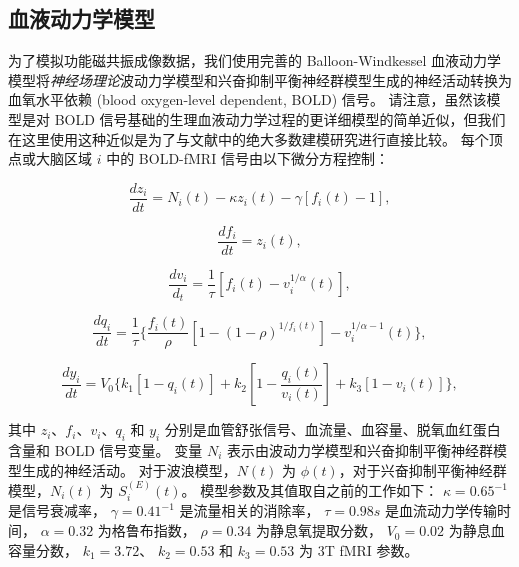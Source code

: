 \documentclass[lang=cn,a4paper,newtx]{elegantpaper}
\begin{document}
\subsection{血液动力学模型} \label{sec:haemodynamic_model}

为了模拟功能磁共振成像数据，我们使用完善的 Balloon-Windkessel 血液动力学模型将\textit{神经场理论}波动力学模型和兴奋抑制平衡神经群模型生成的神经活动转换为血氧水平依赖 (blood oxygen-level dependent, BOLD) 信号\cite{stephan2007comparing}。
请注意，虽然该模型是对 BOLD 信号\cite{aquino2012hemodynamic,pang2017effects,pang2018biophysically}基础的生理血液动力学过程的更详细模型的简单近似，但我们在这里使用这种近似是为了与文献中的绝大多数建模研究进行直接比较\cite{deco2021dynamical,demirtacs2019hierarchical,aquino2022intersection,deco2009key,cabral2014exploring}。
每个顶点或大脑区域 $ i $ 中的 BOLD-fMRI 信号由以下微分方程控制：

\begin{equation}\label{eq:vasodilatory_signal}
	\frac{dz_i}{dt} = N_i (t) - 
					  \kappa z_i(t) - 
					  \gamma [f_i(t) - 1], 
\end{equation}


\begin{equation}\label{eq:blood_inflow}
	\frac{df_i}{dt} = z_i(t),
\end{equation}


\begin{equation}\label{eq:blood_volume}
	\frac{dv_i}{d_t} = \frac{1}{\tau} [f_i(t) - v_i^{1/\alpha} (t)],
\end{equation}


\begin{equation}\label{eq:deoxyhaemoglobin}
	\frac{dq_i}{dt} = \frac{1}{\tau}
					\{
					\frac{f_i(t)}{\rho}
					[1 - (1-\rho)^{1/f_i(t)}]
						- v_i^{1/\alpha - 1} (t)
					\},
\end{equation}


\begin{equation}\label{eq:BOLD_signal}
	\frac{dy_i}{dt} = V_0
					\{
						k_1 [1 - q_i(t)] +
						k_2 [1 - \frac{q_i(t)}{v_i(t)}] + 
						k_3 [1 - v_i(t)]
					\},
\end{equation}


其中 $ z_i $、$ f_i $、$ v_i $、$ q_i $ 和 $ y_i $ 分别是血管舒张信号、血流量、血容量、脱氧血红蛋白含量和 BOLD 信号变量。
变量 $ N_i $ 表示由波动力学模型和兴奋抑制平衡神经群模型生成的神经活动。
对于波浪模型，$ N(t) $ 为 $ \phi (t) $，对于兴奋抑制平衡神经群模型，$ N_i (t) $ 为 $ S_i^{(E)} (t) $。
模型参数及其值取自之前的工作\cite{stephan2007comparing,heinzle2016hemodynamic}如下：
$ \kappa = 0.65^{-1} $ 是信号衰减率，
$ \gamma = 0.41^{-1} $ 是流量相关的消除率，
$ \tau = 0.98 s $ 是血流动力学传输时间，
$ \alpha = 0.32 $ 为格鲁布指数，
$ \rho = 0.34 $ 为静息氧提取分数，
$ V_0 = 0.02 $ 为静息血容量分数，
$ k_1 = 3.72 $、
$ k_2 = 0.53 $ 
和 $ k_3 = 0.53 $ 为 3T fMRI 参数。
\end{document}
